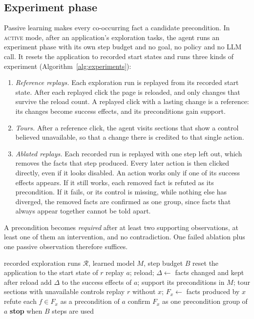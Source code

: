 \documentclass[conference]{IEEEtran}
\newcommand{\modeActive}{\textsc{active}}
\begin{document}
\subsection{Experiment phase}
\label{sec:experiments}
Passive learning makes every co-occurring fact a candidate precondition. In \modeActive{} mode, after an application's exploration tasks, the agent runs an experiment phase with its own step budget and no goal, no policy and no LLM call. It resets the application to recorded start states and runs three kinds of experiment (Algorithm~\ref{alg:experiments}):
\begin{enumerate}
\item \emph{Reference replays.} Each exploration run is replayed from its recorded start state. After each replayed click the page is reloaded, and only changes that survive the reload count. A replayed click with a lasting change is a reference: its changes become success effects, and its preconditions gain support.
\item \emph{Tours.} After a reference click, the agent visits sections that show a control believed unavailable, so that a change there is credited to that single action.
\item \emph{Ablated replays.} Each recorded run is replayed with one step left out, which removes the facts that step produced. Every later action is then clicked directly, even if it looks disabled. An action works only if one of its success effects appears. If it still works, each removed fact is refuted as its precondition. If it fails, or its control is missing, while nothing else has diverged, the removed facts are confirmed as one group, since facts that always appear together cannot be told apart.
\end{enumerate}
A precondition becomes \emph{required} after at least two supporting observations, at least one of them an intervention, and no contradiction. One failed ablation plus one passive observation therefore suffices.

\begin{algorithm}[t]
\caption{Experiment phase (no LLM calls)}
\label{alg:experiments}
\begin{algorithmic}[1]
\Require recorded exploration runs $\mathcal{R}$, learned model $M$, step budget $B$
 
  \State reset the application to the start state of $r$
    \State replay $a$; reload; $\Delta \gets$ facts changed and kept after reload
    \If{$\Delta \neq \emptyset$} add $\Delta$ to the success effects of $a$; support its preconditions in $M$; tour sections with unavailable controls \EndIf
  \EndFor
\EndFor
{} 
  \State replay $r$ without $x$; $F_x \gets$ facts produced by $x$
     refute each $f \in F_x$ as a precondition of $a$
     confirm $F_x$ as one precondition group of $a$
    \EndIf
  \EndFor
  \State \textbf{stop} when $B$ steps are used
\EndFor
\end{algorithmic}
\end{algorithm}
\end{document}
